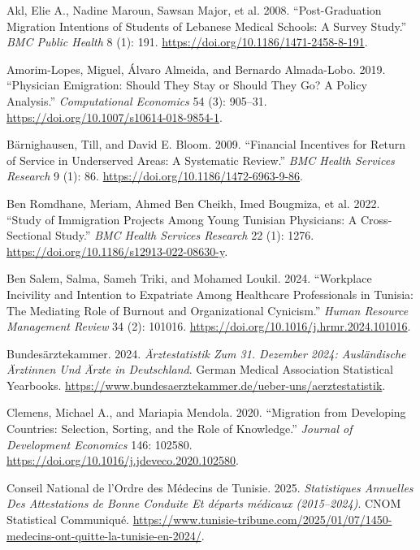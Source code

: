 \documentclass[
  11pt,
  a4paper]{article}
\newlength{\cslhangindent}
\newenvironment{CSLReferences}[2] %
 {\begin{list}{}{%
  \setlength{\itemindent}{0pt}
  \setlength{\leftmargin}{0pt}
  \setlength{\parsep}{0pt}
  \ifodd #1
   \setlength{\leftmargin}{\cslhangindent}
   \setlength{\itemindent}{-1\cslhangindent}
  \fi
  \setlength{\itemsep}{#2\baselineskip}}}
 {\end{list}}
\begin{document}
\protect{}\label{refs}
\begin{CSLReferences}{1}{1}
Akl, Elie A., Nadine Maroun, Sawsan Major, et al. 2008.
{``Post-Graduation Migration Intentions of Students of {Lebanese}
Medical Schools: A Survey Study.''} \emph{BMC Public Health} 8 (1): 191.
\url{https://doi.org/10.1186/1471-2458-8-191}.

Amorim-Lopes, Miguel, Álvaro Almeida, and Bernardo Almada-Lobo. 2019.
{``Physician Emigration: Should They Stay or Should They Go? {A} Policy
Analysis.''} \emph{Computational Economics} 54 (3): 905--31.
\url{https://doi.org/10.1007/s10614-018-9854-1}.

Bärnighausen, Till, and David E. Bloom. 2009. {``Financial Incentives
for Return of Service in Underserved Areas: A Systematic Review.''}
\emph{BMC Health Services Research} 9 (1): 86.
\url{https://doi.org/10.1186/1472-6963-9-86}.

Ben Romdhane, Meriam, Ahmed Ben Cheikh, Imed Bougmiza, et al. 2022.
{``Study of Immigration Projects Among Young {Tunisian} Physicians: A
Cross-Sectional Study.''} \emph{BMC Health Services Research} 22 (1):
1276. \url{https://doi.org/10.1186/s12913-022-08630-y}.

Ben Salem, Salma, Sameh Triki, and Mohamed Loukil. 2024. {``Workplace
Incivility and Intention to Expatriate Among Healthcare Professionals in
{Tunisia}: The Mediating Role of Burnout and Organizational Cynicism.''}
\emph{Human Resource Management Review} 34 (2): 101016.
\url{https://doi.org/10.1016/j.hrmr.2024.101016}.

Bundesärztekammer. 2024. \emph{{Ä}rztestatistik Zum 31. Dezember 2024:
Ausl{ä}ndische {Ä}rztinnen Und {Ä}rzte in Deutschland}. German Medical
Association Statistical Yearbooks.
\url{https://www.bundesaerztekammer.de/ueber-uns/aerztestatistik}.

Clemens, Michael A., and Mariapia Mendola. 2020. {``Migration from
Developing Countries: Selection, Sorting, and the Role of Knowledge.''}
\emph{Journal of Development Economics} 146: 102580.
\url{https://doi.org/10.1016/j.jdeveco.2020.102580}.

Conseil National de l'Ordre des Médecins de Tunisie. 2025.
\emph{Statistiques Annuelles Des Attestations de Bonne Conduite Et
d{é}parts m{é}dicaux (2015--2024)}. CNOM Statistical Communiqu{é}.
\url{https://www.tunisie-tribune.com/2025/01/07/1450-medecins-ont-quitte-la-tunisie-en-2024/}.


\end{CSLReferences}
\end{document}
